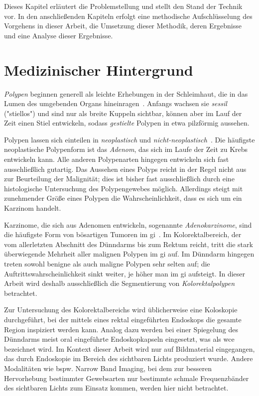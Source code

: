 Dieses Kapitel erläutert die Problemstellung und stellt den Stand der Technik vor.
In den anschließenden Kapiteln erfolgt eine methodische Aufschlüsselung des Vorgehens in dieser Arbeit, die Umsetzung dieser Methodik, deren Ergebnisse und eine Analyse dieser Ergebnisse.



\section{Medizinischer Hintergrund}

\emph{Polypen} beginnen generell als leichte Erhebungen in der Schleimhaut, die in das Lumen des umgebenden Organs hineinragen~\cite{Kumar.2005}.
Anfangs wachsen sie \emph{sessil} ("stiellos") und sind nur als breite Kuppeln sichtbar, können aber im Lauf der Zeit einen Stiel entwickeln, sodass \emph{gestielte} Polypen in etwa pilzförmig aussehen.

Polypen lassen sich einteilen in \emph{neoplastisch} und \emph{nicht-neoplastisch}~\cite{Kumar.2005}.
Die häufigste neoplastische Polypenform ist das \emph{Adenom}, das sich im Laufe der Zeit zu Krebs entwickeln kann.
Alle anderen Polypenarten hingegen entwickeln sich fast ausschließlich gutartig.
Das Aussehen eines Polyps reicht in der Regel nicht aus zur Beurteilung der Malignität; dies ist bisher fast ausschließlich durch eine histologische Untersuchung des Polypengewebes möglich.
Allerdings steigt mit zunehmender Größe eines Polypen die Wahrscheinlichkeit, dass es sich um ein Karzinom handelt.

Karzinome, die sich aus Adenomen entwickeln, sogenannte \emph{Adenokarzinome}, sind die häufigste Form von bösartigen Tumoren im \gls{gi}~\cite{Kumar.2005}.
Im Kolorektalbereich, der vom allerletzten Abschnitt des Dünndarms bis zum Rektum reicht, tritt die stark überwiegende Mehrheit aller malignen Polypen im \gls{gi} auf.
Im Dünndarm hingegen treten sowohl benigne als auch maligne Polypen sehr selten auf; die Auftrittswahrscheinlichkeit sinkt weiter, je höher man im \gls{gi} aufsteigt.
In dieser Arbeit wird deshalb ausschließlich die Segmentierung von \emph{Kolorektalpolypen} betrachtet.

Zur Untersuchung des Kolorektalbereichs wird üblicherweise eine Koloskopie durchgeführt, bei der mittels eines rektal eingeführten Endoskops die gesamte Region inspiziert werden kann.
Analog dazu werden bei einer Spiegelung des Dünndarms meist oral eingeführte Endoskopkapseln eingesetzt, was als \gls{wce} bezeichnet wird.
Im Kontext dieser Arbeit wird nur auf Bildmaterial eingegangen, das durch Endoskopie im Bereich des sichtbaren Lichts produziert wurde.
Andere Modalitäten wie bspw. Narrow Band Imaging, bei dem zur besseren Hervorhebung bestimmter Gewebsarten nur bestimmte schmale Frequenzbänder des sichtbaren Lichts zum Einsatz kommen, werden hier nicht betrachtet.



